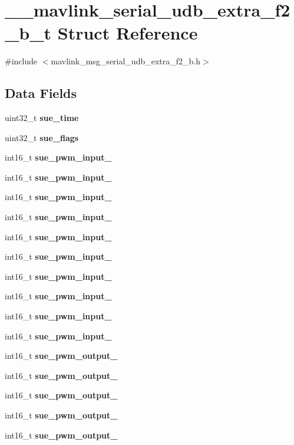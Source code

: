 \section{\+\_\+\+\_\+mavlink\+\_\+serial\+\_\+udb\+\_\+extra\+\_\+f2\+\_\+b\+\_\+t Struct Reference}
\label{struct____mavlink__serial__udb__extra__f2__b__t}


{\ttfamily \#include $<$mavlink\+\_\+msg\+\_\+serial\+\_\+udb\+\_\+extra\+\_\+f2\+\_\+b.\+h$>$}

\subsection*{Data Fields}
\begin{DoxyCompactItemize}
\item 
uint32\+\_\+t \textbf{ sue\+\_\+time}
\item 
uint32\+\_\+t \textbf{ sue\+\_\+flags}
\item 
int16\+\_\+t \textbf{ sue\+\_\+pwm\+\_\+input\+\_}
\item 
int16\+\_\+t \textbf{ sue\+\_\+pwm\+\_\+input\+\_}
\item 
int16\+\_\+t \textbf{ sue\+\_\+pwm\+\_\+input\+\_}
\item 
int16\+\_\+t \textbf{ sue\+\_\+pwm\+\_\+input\+\_}
\item 
int16\+\_\+t \textbf{ sue\+\_\+pwm\+\_\+input\+\_}
\item 
int16\+\_\+t \textbf{ sue\+\_\+pwm\+\_\+input\+\_}
\item 
int16\+\_\+t \textbf{ sue\+\_\+pwm\+\_\+input\+\_}
\item 
int16\+\_\+t \textbf{ sue\+\_\+pwm\+\_\+input\+\_}
\item 
int16\+\_\+t \textbf{ sue\+\_\+pwm\+\_\+input\+\_}
\item 
int16\+\_\+t \textbf{ sue\+\_\+pwm\+\_\+input\+\_}
\item 
int16\+\_\+t \textbf{ sue\+\_\+pwm\+\_\+output\+\_}
\item 
int16\+\_\+t \textbf{ sue\+\_\+pwm\+\_\+output\+\_}
\item 
int16\+\_\+t \textbf{ sue\+\_\+pwm\+\_\+output\+\_}
\item 
int16\+\_\+t \textbf{ sue\+\_\+pwm\+\_\+output\+\_}
\item 
int16\+\_\+t \textbf{ sue\+\_\+pwm\+\_\+output\+\_}
\item 

\end{DoxyCompactItemize}
